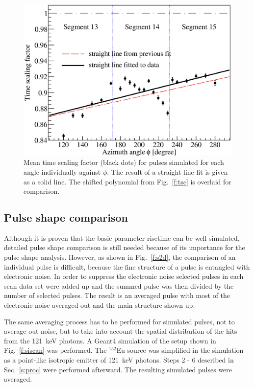 \documentclass[epj,referee]{svjour}
\begin{document}
\begin{figure}[htpb]
\centering
\includegraphics[width=\linewidth]{tsline}
\caption{Mean time scaling factor (black dots) for pulses simulated
for each angle individually against $\phi$. The result of a straight
line fit is given as a solid line. The shifted polynomial from
Fig.~\ref{f:tsc} is overlaid for comparison.}
\label{f:tsl}
\end{figure}


\subsection{Pulse shape comparison}
\label{s:psc}
Although it is proven that the basic parameter risetime can be well
simulated, detailed pulse shape comparison is still needed because of
its importance for the pulse shape analysis. However, as shown in
Fig.~\ref{f:s2d}, the comparison of an individual pulse is difficult,
because the fine structure of a pulse is entangled with electronic
noise. In order to suppress the electronic noise selected pulses in
each scan data set were added up and the summed pulse was then divided
by the number of selected pulses. The result is an averaged pulse with
most of the electronic noise averaged out and the main structure shown
up.

The same averaging process has to be performed for simulated pulses,
not to average out noise, but to take into account the spatial
distribution of the hits from the 121~keV photons. A Geant4 simulation
of the setup shown in Fig.~\ref{f:siscan} was performed. The
$^{152}$Eu source was simplified in the simulation as a point-like
isotropic emitter of 121~keV photons. Steps 2 - 6 described in
Sec.~\ref{s:proc} were performed afterward. The resulting simulated
pulses were averaged.
\end{document}
